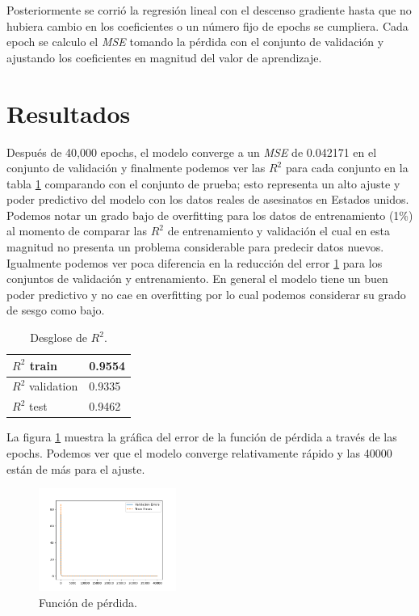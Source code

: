 \documentclass[twocolumn]{article}
\begin{document}
Posteriormente se corrió la regresión lineal con el descenso gradiente hasta que 
no hubiera cambio en los coeficientes o un número fijo de epochs se cumpliera. 
Cada epoch se calculo el \textit{MSE} tomando la pérdida con el conjunto de validación
y ajustando los coeficientes en magnitud del valor de aprendizaje.

\section{Resultados}
Después de 40,000 epochs, el modelo converge a un \textit{MSE} de 0.042171 en el
conjunto de validación y finalmente podemos ver las $R^2$ para cada conjunto en
la tabla \ref{fig:r2} comparando con el conjunto de prueba; esto representa un 
alto ajuste y poder predictivo del modelo con los datos reales de asesinatos en Estados unidos.
Podemos notar un grado bajo de overfitting para los datos de entrenamiento (1\%)
al momento de comparar las $R^2$ de entrenamiento y validación el cual en esta 
magnitud no presenta un problema considerable para predecir datos nuevos. 
Igualmente podemos ver poca diferencia en la reducción del error \ref{fig:loss}
para los conjuntos de validación y entrenamiento.
En general el modelo tiene un buen poder predictivo y no cae en overfitting 
por lo cual podemos considerar su grado de sesgo como bajo.

\begin{table}[!ht]
\begin{center}
\begin{tabular}{|l|l|}
\hline
$R^2$ train      & 0.9554   \\
\hline
$R^2$ validation & 0.9335   \\
\hline
$R^2$ test       & 0.9462   \\ 
\hline
\end{tabular}
\caption{Desglose de $R^2$.}
\label{fig:r2}
\end{center}
\end{table}

La figura \ref{fig:loss} muestra la gráfica del error de la función de pérdida a través de las epochs.
Podemos ver que el modelo converge relativamente rápido y las 40000 están de más para el ajuste.

\begin{figure}[!ht]
\centering
\includegraphics[width=0.4\textwidth]{assets/error.png}
\caption{Función de pérdida.}
\label{fig:loss}
\end{figure}
\end{document}

